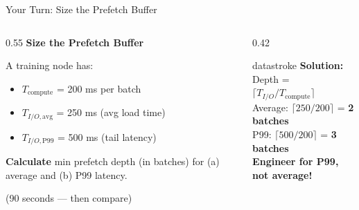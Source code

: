 \documentclass[aspectratio=169, 12pt]{beamer}
\begin{document}
\begin{frame}{Your Turn: Size the Prefetch Buffer}

\small
\begin{columns}[T]
  \begin{column}{0.55\textwidth}
    {\normalsize\bfseries Size the Prefetch Buffer}

    \vspace{0.15cm}
    {\footnotesize A training node has:}
    \begin{itemize}\setlength\itemsep{0pt}
      \item {\footnotesize $T_{\text{compute}}$ = 200 ms per batch}
      \item {\footnotesize $T_{I/O,\text{avg}}$ = 250 ms (avg load time)}
      \item {\footnotesize $T_{I/O,\text{P99}}$ = 500 ms (tail latency)}
    \end{itemize}

    \vspace{0.05cm}
    {\footnotesize \textbf{Calculate} min prefetch depth (in batches) for (a) average and (b) P99 latency.}

    {\footnotesize\textcolor{midgray}{(90 seconds --- then compare)}}
  \end{column}
  \begin{column}{0.42\textwidth}
    \pause
    \begin{mlsyscard}{datastroke}
    \textbf{Solution:}\\[0.05cm]
    {\scriptsize
    Depth = $\lceil T_{I/O} / T_{\text{compute}} \rceil$\\[0.05cm]
    Average: $\lceil 250/200 \rceil$ = \textbf{2 batches}\\
    P99: $\lceil 500/200 \rceil$ = \textbf{3 batches}\\[0.05cm]
    \textcolor{datastroke}{\textbf{Engineer for P99, not average!}}
    }
    \end{mlsyscard}
  \end{column}
\end{columns}

\end{frame}
\end{document}
